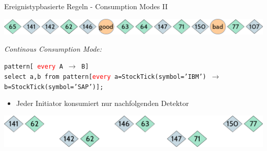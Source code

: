 \documentclass[usenames,dvipsnames]{beamer}
\begin{document}
\begin{frame}{Ereignistypbasierte Regeln - Consumption Modes II}
\begin{center}
    \includegraphics[scale=0.4]{img/stream-2}
\end{center}
\begin{exampleblock}{\textit{Continous Consumption Mode:}}
    \begin{center}
        \texttt{pattern[ \textcolor{red}{every} A $\rightarrow$ B]}\\\vspace{0.3cm}
        \texttt{select a,b from pattern[\textcolor{red}{every} a=StockTick(symbol='IBM') 
            $\rightarrow$ b=StockTick(symbol='SAP')];}
    \end{center}
    \begin{itemize}
        \item Jeder Initiator konsumiert nur nachfolgenden Detektor
    \end{itemize}
\end{exampleblock}

\begin{center}
    \includegraphics[scale=0.3]{img/solution-d}
\end{center}
\end{frame}
\end{document}

